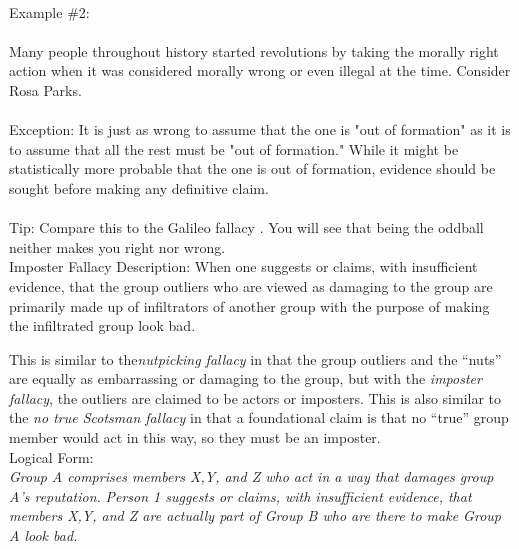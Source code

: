 \documentclass[a4paper,12pt,single,pdftex]{scrbook}
\begin{document}
    
      
    \\

    
      Example \#2:
    \\

    
      
    \\

    
      Many people throughout history started revolutions by taking the morally right action when it was considered morally wrong or even illegal at the time. Consider Rosa Parks.
    \\

    
      
    \\

    
      Exception: It is just as wrong to assume that the one is "out of formation" as it is to assume that all the rest must be "out of formation." While it might be statistically more probable that the one is out of formation, evidence should be sought before making any definitive claim.
    \\

    
      
    \\

    
      Tip: Compare this to the Galileo fallacy . You will see that being the oddball neither makes you right nor wrong.
    \\

  

Imposter Fallacy
    Description: When one suggests or claims, with insufficient evidence, that the group outliers who are viewed as damaging to the group are primarily made up of infiltrators of another group with the purpose of making the infiltrated group look bad.

    
      This is similar to the{\em  {\it nutpicking fallacy} }in that the group outliers and the “nuts” are equally as embarrassing or damaging to the group, but with the {\em imposter fallacy}, the outliers are claimed to be actors or imposters. This is also similar to the {\em no true Scotsman fallacy} in that a foundational claim is that no “true” group member would act in this way, so they must be an imposter.
    \\

    
      Logical Form:
    \\

    
      {\em Group A comprises members X,Y, and Z who act in a way that damages group A’s reputation.} \newline
{\em Person 1 suggests or claims, with insufficient evidence, that members X,Y, and Z are actually part of Group B who are there to make Group A look bad.}
    \\
\end{document}
